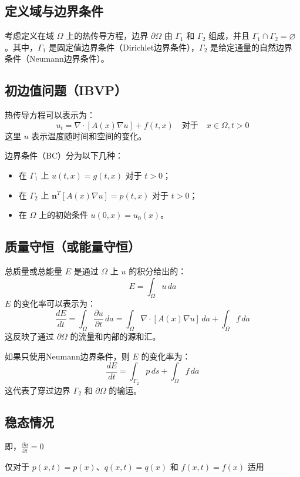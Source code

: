\documentclass{ctexart}
\begin{document}
\subsection*{定义域与边界条件}
考虑定义在域 \( \Omega \) 上的热传导方程，边界 \( \partial \Omega \) 由 \( \Gamma_1 \) 和 \( \Gamma_2 \) 组成，并且 \( \Gamma_1 \cap \Gamma_2 = \varnothing \)。其中，\( \Gamma_1 \) 是固定值边界条件（Dirichlet边界条件），\( \Gamma_2 \) 是给定通量的自然边界条件（Neumann边界条件）。

\subsection*{初边值问题（IBVP）}
热传导方程可以表示为：
\[
u_t = \nabla \cdot [A(x) \nabla u] + f(t,x) \quad \text{对于} \quad x \in \Omega, t > 0
\]
这里 \( u \) 表示温度随时间和空间的变化。

边界条件（BC）分为以下几种：
\begin{itemize}
  \item 在 \( \Gamma_1 \) 上 \( u(t,x) = g(t,x) \) 对于 \( t > 0 \)；
  \item 在 \( \Gamma_2 \) 上 \( \boldsymbol{n}^T [A(x) \nabla u] = p(t,x) \) 对于 \( t > 0 \)；
  \item 在 \( \Omega \) 上的初始条件 \( u(0,x) = u_0(x) \)。
\end{itemize}

\subsection*{质量守恒（或能量守恒）}
总质量或总能量 \( E \) 是通过 \( \Omega \) 上 \( u \) 的积分给出的：
\[
E = \int_\Omega u \, da
\]
\( E \) 的变化率可以表示为：
\[
\frac{dE}{dt} = \int_\Omega \frac{\partial u}{\partial t} \, da = \int_\Omega \nabla \cdot [A(x) \nabla u] \, da + \int_\Omega f \, da
\]
这反映了通过 \( \partial \Omega \) 的流量和内部的源和汇。

如果只使用Neumann边界条件，则 \( E \) 的变化率为：
\[
\frac{dE}{dt} = \int_{\Gamma_2} p \, ds + \int_\Omega f \, da
\]
这代表了穿过边界 \( \Gamma_2 \) 和 \( \partial \Omega \) 的输运。



\subsection*{稳态情况}

即，\( \frac{\partial u}{\partial t} = 0 \)

仅对于 \( p(x,t) = p(x) \)、\( q(x,t) = q(x) \) 和 \( f(x,t) = f(x) \) 适用
\end{document}
